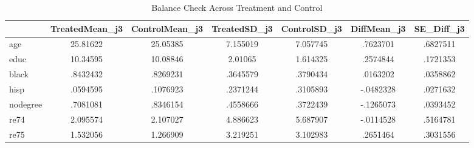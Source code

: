 \begin{table}[htbp]\centering
\caption{Balance Check Across Treatment and Control}
\begin{tabular}{l*{6}{c}}
\hline\hline
            &TreatedMean\_j3&ControlMean\_j3&TreatedSD\_j3&ControlSD\_j3& DiffMean\_j3&  SE\_Diff\_j3\\
\hline
age         &    25.81622&    25.05385&    7.155019&    7.057745&    .7623701&    .6827511\\
educ        &    10.34595&    10.08846&     2.01065&    1.614325&    .2574844&    .1721353\\
black       &    .8432432&    .8269231&    .3645579&    .3790434&    .0163202&    .0358862\\
hisp        &    .0594595&    .1076923&    .2371244&    .3105893&   -.0482328&    .0271632\\
nodegree    &    .7081081&    .8346154&    .4558666&    .3722439&   -.1265073&    .0393452\\
re74        &    2.095574&    2.107027&    4.886623&    5.687907&   -.0114528&    .5164781\\
re75        &    1.532056&    1.266909&    3.219251&    3.102983&    .2651464&    .3031556\\
\hline\hline
\end{tabular}
\end{table}
